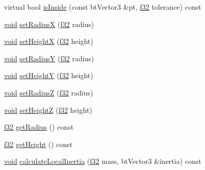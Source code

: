 \begin{DoxyCompactItemize}
\item 
virtual bool \mbox{\hyperlink{classnjli_1_1_physics_shape_cone_a9641ea16321a24d8eccef232761b5197}{is\+Inside}} (const bt\+Vector3 \&pt, \mbox{\hyperlink{_util_8h_a5f6906312a689f27d70e9d086649d3fd}{f32}} tolerance) const
\item 
\mbox{\hyperlink{_thread_8h_af1e856da2e658414cb2456cb6f7ebc66}{void}} \mbox{\hyperlink{classnjli_1_1_physics_shape_cone_a8a67974576e194c97ee8106135d94c65}{set\+RadiusX}} (\mbox{\hyperlink{_util_8h_a5f6906312a689f27d70e9d086649d3fd}{f32}} radius)
\item 
\mbox{\hyperlink{_thread_8h_af1e856da2e658414cb2456cb6f7ebc66}{void}} \mbox{\hyperlink{classnjli_1_1_physics_shape_cone_a28c6c8539b9756348191fd0504512993}{set\+HeightX}} (\mbox{\hyperlink{_util_8h_a5f6906312a689f27d70e9d086649d3fd}{f32}} height)
\item 
\mbox{\hyperlink{_thread_8h_af1e856da2e658414cb2456cb6f7ebc66}{void}} \mbox{\hyperlink{classnjli_1_1_physics_shape_cone_add9d625b2039fa0689e410cf86f2df88}{set\+RadiusY}} (\mbox{\hyperlink{_util_8h_a5f6906312a689f27d70e9d086649d3fd}{f32}} radius)
\item 
\mbox{\hyperlink{_thread_8h_af1e856da2e658414cb2456cb6f7ebc66}{void}} \mbox{\hyperlink{classnjli_1_1_physics_shape_cone_a6b504b0f28f39e21cf5ef9c07314b4ef}{set\+HeightY}} (\mbox{\hyperlink{_util_8h_a5f6906312a689f27d70e9d086649d3fd}{f32}} height)
\item 
\mbox{\hyperlink{_thread_8h_af1e856da2e658414cb2456cb6f7ebc66}{void}} \mbox{\hyperlink{classnjli_1_1_physics_shape_cone_a67f210be934ad9f9ce06d5edbfa0ee53}{set\+RadiusZ}} (\mbox{\hyperlink{_util_8h_a5f6906312a689f27d70e9d086649d3fd}{f32}} radius)
\item 
\mbox{\hyperlink{_thread_8h_af1e856da2e658414cb2456cb6f7ebc66}{void}} \mbox{\hyperlink{classnjli_1_1_physics_shape_cone_a7a900e59ca5b55008a85011a14bb6f85}{set\+HeightZ}} (\mbox{\hyperlink{_util_8h_a5f6906312a689f27d70e9d086649d3fd}{f32}} height)
\item 
\mbox{\hyperlink{_util_8h_a5f6906312a689f27d70e9d086649d3fd}{f32}} \mbox{\hyperlink{classnjli_1_1_physics_shape_cone_af5f9bdb09664649e9d7398624f5db6df}{get\+Radius}} () const
\item 
\mbox{\hyperlink{_util_8h_a5f6906312a689f27d70e9d086649d3fd}{f32}} \mbox{\hyperlink{classnjli_1_1_physics_shape_cone_a71aebb1e12422618b5d09c8d91c040e8}{get\+Height}} () const
\item 
\mbox{\hyperlink{_thread_8h_af1e856da2e658414cb2456cb6f7ebc66}{void}} \mbox{\hyperlink{classnjli_1_1_physics_shape_cone_a21fa87ea8cac650b68b2e42105923c0a}{calculate\+Local\+Inertia}} (\mbox{\hyperlink{_util_8h_a5f6906312a689f27d70e9d086649d3fd}{f32}} mass, bt\+Vector3 \&inertia) const

\end{DoxyCompactItemize}
